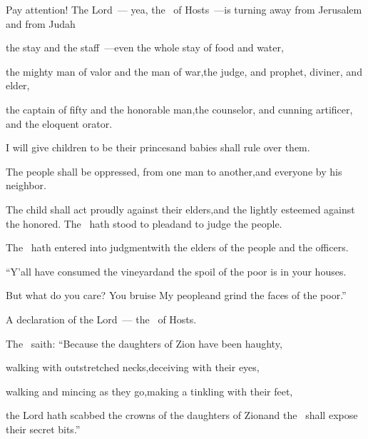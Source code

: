 
\begin{inparaenum}
  \pa{} Pay attention! The Lord~--- yea, the \lord\ of Hosts~---\pa{}is turning away from Jerusalem and from Judah%

  \pb{}the stay and the staff~---\pa{}even the whole stay of food and water,%

  \pa{} the mighty man of valor and the man of war,\pa{}the judge, and prophet, diviner, and elder,%

  \pb{} the captain of fifty and the honorable man,\pa{}the counselor, and cunning artificer, and the eloquent orator.%

  \pb{} I will give children to be their princes\pa{}and babies shall rule over them.%

  \pb{} The people shall be oppressed, from one man to another,\pa{}and everyone by his neighbor.%

  \pa{}The child shall act proudly against their elders,\pa{}and the lightly esteemed against the honored.%
  \pa{} The \lord\ hath stood to plead\pa{}and to judge the people.%

  \pa{} The \lord\ hath entered into judgment\pa{}with the elders of the people and the officers.%

  \pa{}``Y'all have consumed the vineyard\pa{}and the spoil of the poor is in your houses.%

  \pa{} But what do you care? You bruise My people\pa{}and grind the faces of the poor.''%

  \pb{}A declaration of the Lord~--- the \lord\ of Hosts.%

  \pa{} The \lord\ saith: ``Because the daughters of Zion have been haughty,%

  \pa{}walking with outstretched necks,\pa{}deceiving with their eyes,%

  \pa{}walking and mincing as they go,\pa{}making a tinkling with their feet,%

  \pa{} the Lord hath scabbed%
  the crowns of the daughters of Zion\pa{}and the \lord\ shall expose their secret bits.''%


\end{inparaenum}
